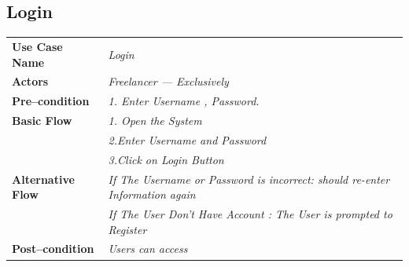 \documentclass{article}
\begin{document}
\subsection{Login}
    \begin{tabular}{ l | l }
    \toprule
      \rowcolor{LightCyan}
      \textbf{Use Case Name}    & \textit{Login}\\
      \textbf{Actors}           & \textit{Freelancer --- Exclusively}\\
      \rowcolor{LightCyan}
      \textbf{Pre--condition}   & \textit{1.  Enter Username  , Password.} \\
      \rowcolor{LightCyan}
      \textbf{Basic Flow}       & \textit{1. Open the System}\\
                                & \textit{2.Enter  Username and Password}\\
                                & \textit{3.Click on Login Button}\\
								
	  \rowcolor{LightCyan}
      \textbf{	Alternative Flow}     
								& \textit{ If The Username or Password is incorrect:
											should re-enter Information again }\\
											
                                & \textit{ If The User Don't Have Account :
											The User is prompted to Register}\\
								
      \rowcolor{LightCyan}
      \textbf{Post--condition}  & \textit{ Users can access}\\
    \toprule
    \end{tabular}
	
	
\end{document}
